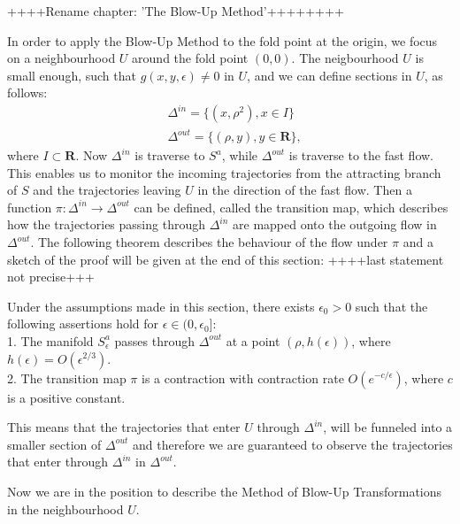 ++++Rename chapter: 'The Blow-Up Method'++++++++

In order to apply the Blow-Up Method to the fold point at the origin, we focus on a neighbourhood $U$ around the fold point $(0,0)$. 
The neigbourhood $U$ is small enough, such that $g(x,y, \epsilon) \neq 0$ in $U$, and we can define sections in $U$, as follows:
\begin{align*}
&\Delta ^{in} = \{ (x, \rho^2), x \in I \} \\
&\Delta ^{out} = \{ (\rho, y), y \in \mathbf{R} \},
\end{align*}
where $I \subset \mathbf{R}$. Now $\Delta^{in}$ is traverse to $S^a$, while $\Delta^{out}$ is traverse to the fast flow. This enables us to monitor the incoming trajectories from the attracting branch of $S$ and the trajectories leaving $U$ in the direction of the fast flow.
Then a function $\pi : \Delta^{in} \to \Delta^{out}$ can be defined, called the transition map, which describes how the trajectories passing through $\Delta^{in}$ are mapped onto the outgoing flow in $\Delta^{out}$.  
The following theorem describes the behaviour of the flow under $\pi$ and a sketch of the proof will be given at the end of this section: ++++last statement not precise+++

\begin{theorem} \label{transition map theorem}
Under the assumptions made in this section, there exists $ \epsilon_0 >0$ such that the following assertions hold for $\epsilon \in (0, \epsilon_0]$:\\
1. The manifold $S_\epsilon^a$ passes through $\Delta^{out}$ at a point $(\rho, h(\epsilon))$, where $h(\epsilon) = O(\epsilon^{2/3})$.\\
2. The transition map $\pi$ is a contraction with contraction rate $O(e^{-c/\epsilon})$, where $c$ is a positive constant.
\end{theorem}
This means that the trajectories that enter $U$ through $\Delta^{in}$, will be funneled into a smaller section of $\Delta^{out}$ and therefore we are guaranteed to observe the trajectories that enter through $\Delta^{in}$ in $\Delta^{out}$.

Now we are in the position to describe the Method of Blow-Up Transformations in the neighbourhood $U$.

